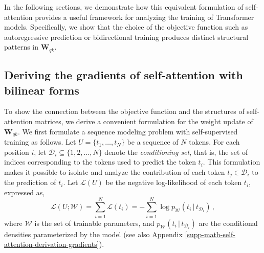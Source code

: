 
In the following sections, we demonstrate how this equivalent formulation of self-attention provides a useful framework for analyzing the training of Transformer models.
%
Specifically, we show that the choice of the objective function such as autoregressive prediction \citep{radfordLanguageModelsAre2019} or bidirectional training \citep{devlinBERTPretrainingDeep2019} produces distinct structural patterns in $\bm{W}_{qk}$.
%






\subsection{Deriving the gradients of self-attention with bilinear forms}
\label{sec:self-attention-derivation-gradient}
%

%
To show the connection between the objective function and the structures of self-attention matrices, we derive a convenient formulation for the weight update of $\bm{W}_{qk}$.
%
We first formulate a sequence modeling problem with self-supervised training as follows. 
%
Let \( U = \{t_1, \dots, t_N\} \) be a sequence of \( N \) tokens. 
%
For each position \( i \), let \( \mathcal{D}_i \subseteq \{1, 2, \dots, N\} \) denote the \emph{conditioning set}, that is, the set of indices corresponding to the tokens used to predict the token \( t_i \).
%
This formulation makes it possible to isolate and analyze the contribution of each token \( t_j \in \mathcal{D}_i \) to the prediction of \( t_i \).
%
Let $\mathcal{L}(U)$ be the negative log-likelihood of each token $t_i$, expressed as,
%
\begin{equation}
    \mathcal{L}(U;\mathcal{W}) = \sum_{i=1}^N \mathcal{L}(t_i)=  - \sum_{i=1}^N \log p_{\mathcal{W}}(t_i \,|\, t_{\mathcal{D}_i}) \,,
\end{equation}
%
where $\mathcal{W}$ is the set of trainable parameters, and $p_{\mathcal{W}}(t_i \,|\, t_{\mathcal{D}_i}) $ are the conditional densities parameterized by the model (see also Appendix \ref{supp-math-self-attention-derivation-gradients}).
%

